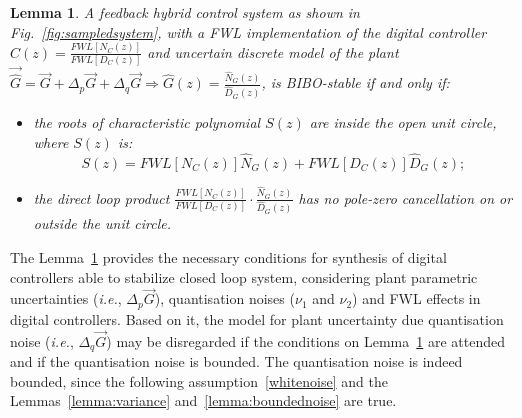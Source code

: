 \documentclass{sig-alternate-05-2015}
\newcommand{\red}[1]{{\color{red}#1}}
\newtheorem{mylemma}{Lemma}
\begin{document}
\begin{mylemma}{\cite{Bessa16,fadali}}
\label{lemma:eq_int_stab} 
A feedback hybrid control system as shown in Fig.~\ref{fig:sampledsystem}, with a FWL implementation of the digital controller $\hat{C}(z) = \frac{FWL[N_{C}(z)]}{FWL[D_{C}(z)]}$ and uncertain discrete model of the plant $\vec{\hat{G}}=\vec{G}+\Delta_p \vec{G}+\Delta_q \vec{G} \Rightarrow \hat{G}(z)=\frac{\hat{N}_{G}(z)}{\hat{D}_{G}(z)}$, is BIBO-stable if and only if: 
\begin{itemize}
\item  the roots of characteristic polynomial $S(z)$ are inside the open unit circle, where $S(z)$ is:
\begin{equation}
\label{eq:internal_stab_lemma}
S(z)=FWL[N_{C}(z)]\hat{N}_{G}(z)+FWL[D_{C}(z)]\hat{D}_{G}(z);
\end{equation}
\item the direct loop product $\frac{FWL[N_{C}(z)]}{FWL[D_{C}(z)]}\cdot \frac{\hat{N}_{G}(z)}{\hat{D}_{G}(z)}$ has no pole-zero cancellation on or outside the unit circle.
\end{itemize}
\end{mylemma}

The Lemma~\ref{lemma:eq_int_stab} provides the necessary conditions for synthesis of digital controllers able to stabilize closed loop system, considering plant parametric uncertainties ({\it i.e.}, $\Delta_p \vec{G}$), quantisation noises ($\nu_{1}$ and $\nu_{2}$) and FWL effects in digital controllers. Based on it, the model for plant uncertainty due quantisation noise ({\it i.e.}, $\Delta_q \vec{G}$) may be disregarded if the conditions on Lemma~\ref{lemma:eq_int_stab} are attended and if the quantisation noise is bounded.  The quantisation noise is indeed bounded, since the following assumption~\ref{whitenoise} and the Lemmas~\ref{lemma:variance} and~\ref{lemma:boundednoise} are true.


 
\end{document}
